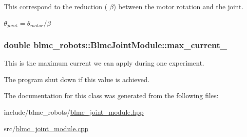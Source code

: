 This correspond to the reduction ( $ \beta $) between the motor rotation and the joint. 

$ \theta_{joint} = \theta_{motor} / \beta $ 
\subsubsection[{\texorpdfstring{max\+\_\+current\+\_\+}{max_current_}}]{\setlength{\rightskip}{0pt plus 5cm}double blmc\+\_\+robots\+::\+Blmc\+Joint\+Module\+::max\+\_\+current\+\_\+\hspace{0.3cm}{\ttfamily [private]}}\hypertarget{classblmc__robots_1_1BlmcJointModule_af10e1b734a9d4735301962fd9f9c413f}{}\label{classblmc__robots_1_1BlmcJointModule_af10e1b734a9d4735301962fd9f9c413f}


This is the maximum current we can apply during one experiment. 

The program shut down if this value is achieved. 

The documentation for this class was generated from the following files\+:\begin{DoxyCompactItemize}
\item 
include/blmc\+\_\+robots/\hyperlink{blmc__joint__module_8hpp}{blmc\+\_\+joint\+\_\+module.\+hpp}\item 
src/\hyperlink{blmc__joint__module_8cpp}{blmc\+\_\+joint\+\_\+module.\+cpp}\end{DoxyCompactItemize}
